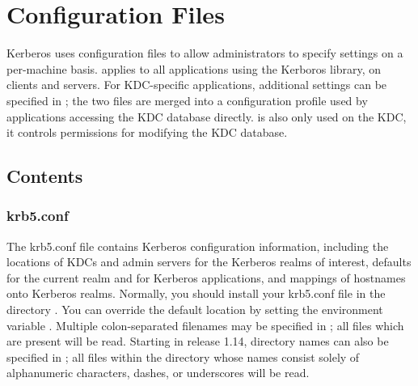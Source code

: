 \documentclass[letterpaper,10pt,english]{sphinxmanual}
\begin{document}
\chapter{Configuration Files}
\label{\detokenize{admin/conf_files/index:configuration-files}}\label{\detokenize{admin/conf_files/index::doc}}
Kerberos uses configuration files to allow administrators to specify
settings on a per-machine basis.  {\hyperref[\detokenize{admin/conf_files/krb5_conf:krb5-conf-5}]{}} applies to all
applications using the Kerboros library, on clients and servers.
For KDC-specific applications, additional settings can be specified in
{\hyperref[\detokenize{admin/conf_files/kdc_conf:kdc-conf-5}]{}}; the two files are merged into a configuration profile
used by applications accessing the KDC database directly.  {\hyperref[\detokenize{admin/conf_files/kadm5_acl:kadm5-acl-5}]{}}
is also only used on the KDC, it controls permissions for modifying the
KDC database.


\section{Contents}
\label{\detokenize{admin/conf_files/index:contents}}

\subsection{krb5.conf}
\label{\detokenize{admin/conf_files/krb5_conf::doc}}\label{\detokenize{admin/conf_files/krb5_conf:krb5-conf}}\label{\detokenize{admin/conf_files/krb5_conf:krb5-conf-5}}
The krb5.conf file contains Kerberos configuration information,
including the locations of KDCs and admin servers for the Kerberos
realms of interest, defaults for the current realm and for Kerberos
applications, and mappings of hostnames onto Kerberos realms.
Normally, you should install your krb5.conf file in the directory
.  You can override the default location by setting the
environment variable .  Multiple colon-separated
filenames may be specified in ; all files which are
present will be read.  Starting in release 1.14, directory names can
also be specified in ; all files within the directory
whose names consist solely of alphanumeric characters, dashes, or
underscores will be read.
\end{document}
